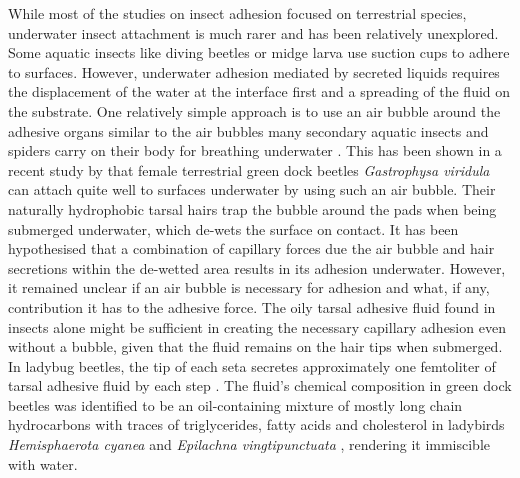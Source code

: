 \documentclass[vruler,JEB]{COB}%
\begin{document}
While most of the studies on insect adhesion focused on terrestrial species, underwater insect attachment is much rarer and has been relatively unexplored. Some aquatic insects like diving beetles \citep{Chen:2014} or midge larva \citep{Kang:2020} use suction cups to adhere to surfaces. However, underwater adhesion mediated by secreted liquids requires the displacement of the water at the interface first and a spreading of the fluid on the substrate. One relatively simple approach is to use an air bubble around the adhesive organs similar to the air bubbles many secondary aquatic insects and spiders carry on their body for breathing underwater \citep{Seymour:2013}. This has been shown in a recent study by \citet{RN87} that female terrestrial green dock beetles \emph{Gastrophysa viridula} can attach quite well to surfaces underwater by using such an air bubble. Their naturally hydrophobic tarsal hairs trap the bubble around the pads when being submerged underwater, which de-wets the surface on contact. It has been hypothesised that a combination of capillary forces due the air bubble and hair secretions within the de-wetted area results in its adhesion underwater. However, it remained unclear if an air bubble is necessary for adhesion and what, if any, contribution it has to the adhesive force. The oily tarsal adhesive fluid found in insects alone might be sufficient in creating the necessary capillary adhesion even without a bubble, given that the fluid remains on the hair tips when submerged. In ladybug beetles, the tip of each seta secretes approximately one femtoliter of tarsal adhesive fluid by each step \citep{RN108}. The fluid's chemical composition in green dock beetles was identified to be an oil-containing mixture of mostly long chain hydrocarbons\citep{RN96} with traces
of triglycerides, fatty acids and cholesterol in ladybirds \emph{Hemisphaerota cyanea} \citep{RN221} and \emph{Epilachna vingtipunctuata} \citep{RN222}, rendering it immiscible with water.
\end{document}
